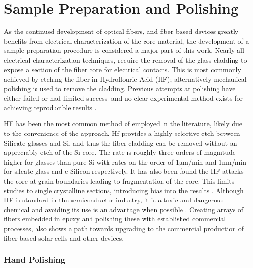 
\chapter{Sample Preparation and Polishing}
As the continued development of optical fibers, and fiber based devices greatly benefits from electrical characterization of the core material, the development of a sample preparation procedure is considered a major part of this work. Nearly all electrical characterization techniques, require the removal of the glass cladding to expose a section of the fiber core for electrical contacts. This is most commonly achieved by etching the fiber in Hydroflouric Acid (HF); alternatively mechanical polishing is used to remove the cladding. Previous attempts at polishing have either failed or had limited success, and no clear experimental method exists for achieving reproducible results \cite{KristinKristin_thesis_final,LapointeElectricalFibres}. 

HF has been the most common method of employed in the literature, likely due to the convenience of the approach. Hf provides a highly selective etch between Silicate glasses and Si, and thus the fiber cladding can be removed without an appreciably etch of the Si core. The rate is roughly three orders of magnitude higher for glasses than pure Si with rates on the order of $1\si{\micro\meter}$/min \cite{Liu2013UnexpectedlyAcid} and $1\si{\nano\meter}$/min \cite{Park2017AApplication} for silcate glass and c-Silicon respectively. It has also been found the HF attacks the core at grain boundaries leading to fragmentation of the core. This limits studies to single crystalline sections, introducing bias into the results  \cite{LapointeElectricalFibres}. Although HF is standard in the semiconductor industry, it is a toxic and dangerous chemical and avoiding its use is an advantage when possible \cite{Product2015SafetySheet}. Creating arrays of fibers embedded in epoxy and polishing these with established commercial processes, also shows a path towards upgrading to the commercial production of fiber based solar cells \cite{} and other devices.  %

\subsection{Hand Polishing}

